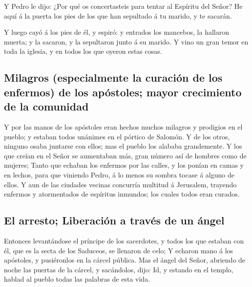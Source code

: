  Y Pedro le dijo: ¿Por qué os concertasteis para tentar al
Espíritu del Señor? He aquí á la puerta los pies de los que han
sepultado á tu marido, y te sacarán.

 Y luego cayó á los pies de él, y espiró: y entrados los
mancebos, la hallaron muerta; y la sacaron, y la sepultaron junto á su
marido.  Y vino un gran temor en toda la iglesia, y en
todos los que oyeron estas cosas.

\hypertarget{milagros-especialmente-la-curaciuxf3n-de-los-enfermos-de-los-apuxf3stoles-mayor-crecimiento-de-la-comunidad}{%
\subsection{Milagros (especialmente la curación de los enfermos) de los
apóstoles; mayor crecimiento de la
comunidad}\label{milagros-especialmente-la-curaciuxf3n-de-los-enfermos-de-los-apuxf3stoles-mayor-crecimiento-de-la-comunidad}}

 Y por las manos de los apóstoles eran hechos muchos
milagros y prodigios en el pueblo; y estaban todos unánimes en el
pórtico de Salomón.  Y de los otros, ninguno osaba juntarse
con ellos; mas el pueblo los alababa grandemente.  Y los
que creían en el Señor se aumentaban más, gran número así de hombres
como de mujeres;  Tanto que echaban los enfermos por las
calles, y los ponían en camas y en lechos, para que viniendo Pedro, á lo
menos su sombra tocase á alguno de ellos.  Y aun de las
ciudades vecinas concurría multitud á Jerusalem, trayendo enfermos y
atormentados de espíritus inmundos; los cuales todos eran curados.

\hypertarget{el-arresto-liberaciuxf3n-a-travuxe9s-de-un-uxe1ngel}{%
\subsection{El arresto; Liberación a través de un
ángel}\label{el-arresto-liberaciuxf3n-a-travuxe9s-de-un-uxe1ngel}}

 Entonces levantándose el príncipe de los sacerdotes, y
todos los que estaban con él, que es la secta de los Saduceos, se
llenaron de celo;  Y echaron mano á los apóstoles, y
pusiéronlos en la cárcel pública.  Mas el ángel del Señor,
abriendo de noche las puertas de la cárcel, y sacándolos, dijo:
 Id, y estando en el templo, hablad al pueblo todas las
palabras de esta vida.

